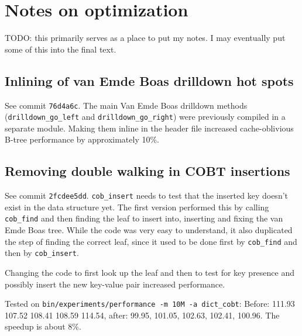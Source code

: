 \section{Notes on optimization}
TODO: this primarily serves as a place to put my notes.
I may eventually put some of this into the final text.

\subsection{Inlining of van Emde Boas drilldown hot spots}
See commit \texttt{76d4a6c}. The main Van Emde Boas drilldown
methods (\texttt{drilldown\_go\_left} and \texttt{drilldown\_go\_right})
were previously compiled in a separate module. Making them inline
in the header file increased cache-oblivious B-tree performance
by approximately 10\%.

\subsection{Removing double walking in COBT insertions}
See commit \texttt{2fcdee5dd}.
\texttt{cob\_insert} needs to test that the inserted key doesn't exist
in the data structure yet. The first version performed this by calling
\texttt{cob\_find} and then finding the leaf to insert into, inserting
and fixing the van Emde Boas tree. While the code was very easy to understand,
it also duplicated the step of finding the correct leaf, since it used
to be done first by \texttt{cob\_find} and then by \texttt{cob\_insert}.

Changing the code to first look up the leaf and then to test for key presence
and possibly insert the new key-value pair increased performance.

Tested on \texttt{bin/experiments/performance -m 10M -a dict\_cobt}:
Before: 111.93 107.52 108.41 108.59 114.54, after:
99.95, 101.05, 102.63, 102.41, 100.96.
The speedup is about 8\%.

